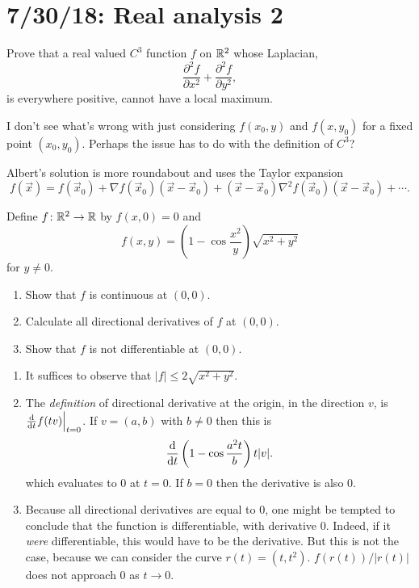 \section{7/30/18: Real analysis 2}
\begin{problem}
	Prove that a real valued $C^3$ function $f$ on $\mathbb{R}^2$ whose Laplacian,
	\[
		\frac{\partial^2 f}{\partial x^2} + \frac{\partial^2 f}{\partial y^2},
	\]
	is everywhere positive, cannot have a local maximum.
\end{problem}
\begin{solution}
	I don't see what's wrong with just considering $f(x_0,y)$ and $f(x,y_0)$ for a fixed point $(x_0,y_0)$. Perhaps the issue has to do with the definition of $C^3$?
	
	Albert's solution is more roundabout and uses the Taylor expansion
	\[
		f(\vec{x}) = f(\vec{x}_0) + \nabla f(\vec{x}_0) (\vec{x} - \vec{x}_0) + (\vec{x} - \vec{x}_0) \nabla^2 f(\vec{x}_0) (\vec{x} - \vec{x}_0) + \cdots.
	\]
\end{solution}

\begin{problem}
	Define $f\colon \mathbb{R}^2 \to \mathbb{R}$ by $f(x,0) = 0$ and
	\[
		f(x,y) = \left( 1 - \cos\frac{x^2}{y} \right) \sqrt{x^2 + y^2}
	\]
	for $y\neq 0$.
	\begin{enumerate}
		\item Show that $f$ is continuous at $(0,0)$.
		\item Calculate all directional derivatives of $f$ at $(0,0)$.
		\item Show that $f$ is not differentiable at $(0,0)$.
	\end{enumerate}
\end{problem}
\begin{solution}
	\begin{enumerate}
		\item It suffices to observe that $|f| \leq 2 \sqrt{x^2 + y^2}$.
		\item The \emph{definition} of directional derivative at the origin, in the direction $v$, is $\deriv[t]f(tv) \Big\rvert_{t=0}$. If $v = (a,b)$ with $b\neq 0$ then this is
		\[
			\deriv[t] \left(1 - \cos \frac{a^2 t}{b}\right) t|v|.
		\]
		which evaluates to $0$ at $t=0$. If $b=0$ then the derivative is also 0.
		\item Because all directional derivatives are equal to 0, one might be tempted to conclude that the function is differentiable, with derivative 0. Indeed, if it \emph{were} differentiable, this would have to be the derivative. But this is not the case, because we can consider the curve $r(t) = (t, t^2)$. $f(r(t)) / |r(t)|$ does not approach 0 as $t\to 0$.
	\end{enumerate}
\end{solution}

